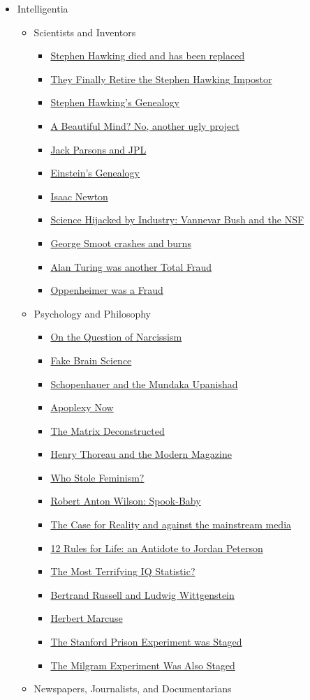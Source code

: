 \documentclass{article}
\newcommand{\insertmydocument}[2]{ %
  \item \href{http://www.mileswmathis.com/#2}{#1}
}
\begin{document}
\begin{itemize}
  \item Intelligentia
  \begin{itemize}

    \item Scientists and Inventors
    \begin{itemize}

      \insertmydocument{Stephen Hawking died and has been replaced}{hawk3.pdf}
      \insertmydocument{They Finally Retire the Stephen Hawking Impostor}{hawk4.pdf}
      \insertmydocument{Stephen Hawking's Genealogy}{hawk5.pdf}
      \insertmydocument{A Beautiful Mind? No, another ugly project}{nash.pdf}
      \insertmydocument{Jack Parsons and JPL}{parsons.pdf}
      \insertmydocument{Einstein's Genealogy}{eingen.pdf}
      \insertmydocument{Isaac Newton}{newton.pdf}
      \insertmydocument{Science Hijacked by Industry: Vannevar Bush and the NSF}{vanne.pdf}
      \insertmydocument{George Smoot crashes and burns}{smoot.pdf}
      \insertmydocument{Alan Turing was another Total Fraud}{turing.pdf}
      \insertmydocument{Oppenheimer was a Fraud}{oppen.pdf}
    \end{itemize}

    \item Psychology and Philosophy
    \begin{itemize}

      \insertmydocument{On the Question of Narcissism}{michael2.pdf}
      \insertmydocument{Fake Brain Science}{skull.pdf}
      \insertmydocument{Schopenhauer and the Mundaka Upanishad}{upan.pdf}
      \insertmydocument{Apoplexy Now}{apoca.pdf}
      \insertmydocument{The Matrix Deconstructed}{matrix2.pdf}
      \insertmydocument{Henry Thoreau and the Modern Magazine}{thor.pdf}
      \insertmydocument{Who Stole Feminism?}{boys.pdf}
      \insertmydocument{Robert Anton Wilson: Spook-Baby}{anton.pdf}
      \insertmydocument{The Case for Reality and against the mainstream media}{real.pdf}
      \insertmydocument{12 Rules for Life: an Antidote to Jordan Peterson}{jorda.pdf}
      \insertmydocument{The Most Terrifying IQ Statistic?}{iq.pdf}
      \insertmydocument{Bertrand Russell and Ludwig Wittgenstein}{russ.pdf}
      \insertmydocument{Herbert Marcuse}{marcuse.pdf}
      \insertmydocument{The Stanford Prison Experiment was Staged}{rutger.pdf}
      \insertmydocument{The Milgram Experiment Was Also Staged}{milgram.pdf}
    \end{itemize}

    \item Newspapers, Journalists, and Documentarians
    \begin{itemize}


\end{itemize}
\end{itemize}
\end{itemize}
\end{document}
